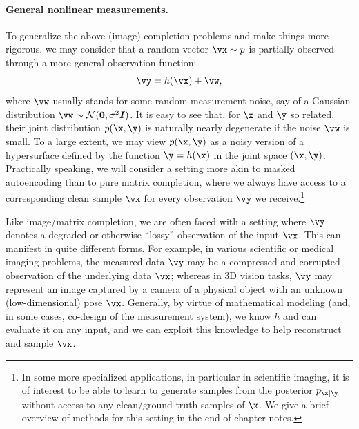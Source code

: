 \documentclass[../../book-main.tex]{subfiles}
\begin{document}
\paragraph{General nonlinear measurements.}
To generalize the above (image) completion problems and make things
more rigorous, we may consider that a random vector $\vx \sim p$ is
partially observed through a more
general observation function:
\begin{equation}\label{eq:measurement-matching-observation}
    \vy = h(\vx) + \vw,
\end{equation}
where $\vw$ usually stands for some random measurement noise, say of
a Gaussian distribution $\vw \sim \mathcal{N}(\mathbf{0}, \sigma^2
\boldsymbol{I})$. It is easy to see that, for $\x$ and $\y$ so
related, their joint distribution $p(\x, \y)$ is naturally nearly
degenerate if the noise $\vw$ is small. To a large extent, we may
view $p(\x, \y)$ as a noisy version of a hypersurface defined by the
function $\y = h(\x)$ in the joint space $(\x, \y)$.  Practically
speaking, we will consider a setting more akin to masked autoencoding
than to pure matrix completion, where we always have access to a
corresponding clean sample $\vx$ for every observation $\vy$ we
receive.\footnote{In some more specialized applications, in
    particular in scientific imaging, it is of interest to be able to
    learn to generate samples from the posterior $p_{\x \mid \y}$ without
    access to any clean/ground-truth samples of $\x$. We give a brief
overview of methods for this setting in the end-of-chapter notes.}

Like image/matrix completion, we
are often faced with a setting where $\vy$ denotes a degraded or otherwise
``lossy''
observation of the input $\vx$. This can manifest in quite different
forms. For example, in various scientific or
medical imaging problems, the measured data $\vy$ may be a compressed and
corrupted observation of the underlying data $\vx$; whereas in 3D vision tasks,
$\vy$ may represent an image captured by a camera of a physical object with an
unknown (low-dimensional) pose $\vx$.
Generally, by virtue of mathematical modeling (and, in some cases, co-design
of the measurement system), we know $h$ and can evaluate it on any input, and
we can exploit this knowledge to help reconstruct and sample $\vx$.
\end{document}

